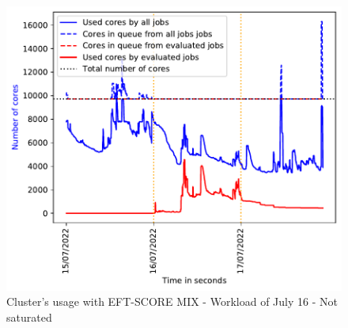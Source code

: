 \documentclass[conference,10pt]{IEEEtran}
\begin{document}
\begin{figure}[H]\centering\includegraphics[width=1\linewidth]{../MBSS/plot/2022-07-16->2022-07-16_V10000_Fcfs_with_a_score_mixed_strategy_x500_x1_x0_x0_Used_nodes_Reduced_450_128_32_256_4_1024.pdf}\caption{Cluster's usage with EFT-SCORE MIX - Workload of July 16 - Not saturated}\end{figure}
\end{document}
